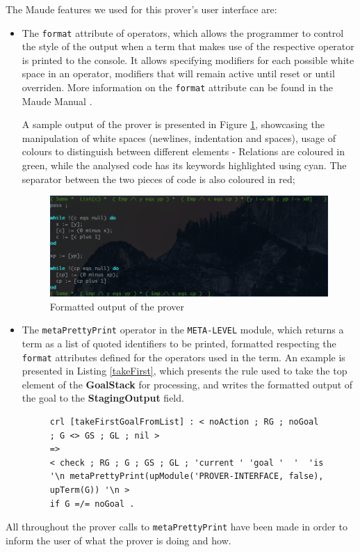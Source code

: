 \documentclass[12pt,a4paper]{article}
\begin{document}
The Maude features we used for this prover's user interface are:
\begin{itemize}
	\item The \texttt{format} attribute of operators, which allows the programmer to control the style of the output when a term that makes use of the respective operator is printed to the console. It allows specifying modifiers for each possible white space in an operator, modifiers that will remain active until reset or until overriden. More information on the \texttt{format} attribute can be found in the Maude Manual \cite{manual}. 
	
	A sample output of the prover is presented in Figure \ref{fig:CLIScreenShot}, showcasing the manipulation of white spaces (newlines, indentation and spaces), usage of colours to distinguish between different elements - Relations are coloured in green, while the analysed code has its keywords highlighted using cyan. The separator between the two pieces of code is also coloured in red;
	\begin{figure}[h]
		\includegraphics[width=\linewidth]{pictures/CLI.png}
		\caption{Formatted output of the prover}
		\label{fig:CLIScreenShot}
	\end{figure}
	\item The \texttt{metaPrettyPrint} operator in the \texttt{META-LEVEL} module, which returns a term as a list of quoted identifiers to be printed, formatted respecting the \texttt{format} attributes defined for the operators used in the term. An example is presented in Listing \ref{takeFirst}, which presents the rule used to take the top element of the \textbf{GoalStack} for processing, and writes the formatted output of the goal to the \textbf{StagingOutput} field.
	\begin{figure}[h]
	\begin{lstlisting}[label=takeFirst,caption=Rewrite rule making use of metaPrettyPrint]
crl [takeFirstGoalFromList] : < noAction ; RG ; noGoal ; G <> GS ; GL ; nil > 
=> 
< check ; RG ; G ; GS ; GL ; 'current ' 'goal '  '  'is '\n metaPrettyPrint(upModule('PROVER-INTERFACE, false), upTerm(G)) '\n > 
if G =/= noGoal .
	\end{lstlisting}
	\end{figure}
\end{itemize}
All throughout the prover calls to \texttt{metaPrettyPrint} have been made in order to inform the user of what the prover is doing and how.
\\
\end{document}
